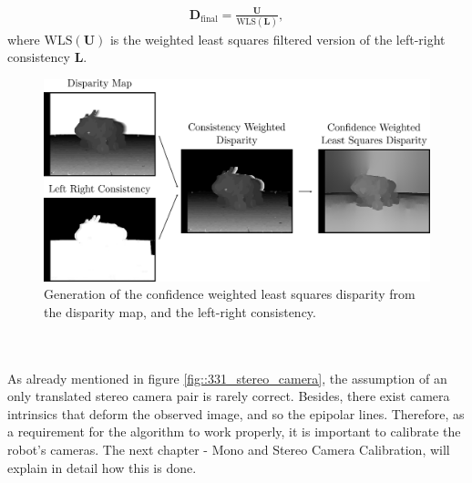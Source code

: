 \begin{align}
	\bm{D}_\text{final} = \frac{\bm{U}}{\text{WLS}(\bm{L})},
	\label{eq::331_wls_final}
\end{align}
where $\text{WLS}(\bm{U})$ is the weighted least squares filtered version of the left-right consistency $\bm{L}$.
\begin{figure}[h!]
	\centering
	\includegraphics[scale=.28]{chapters/03_principles_of_machine_learning/img/weighted_least_squares_disparity.png}
	\caption{Generation of the confidence weighted least squares disparity from the disparity map, and the left-right consistency.}
	\label{fig::331_weighted_least_squares_disparity}
\end{figure}
\\\\
As already mentioned in figure \ref{fig::331_stereo_camera}, the assumption of an only translated stereo camera pair is rarely correct. Besides, there exist camera intrinsics that deform the observed image, and so the epipolar lines. Therefore, as a requirement for the algorithm to work properly, it is important to calibrate the robot's cameras. The next chapter - Mono and Stereo Camera Calibration, will explain in detail how this is done.
\FloatBarrier
